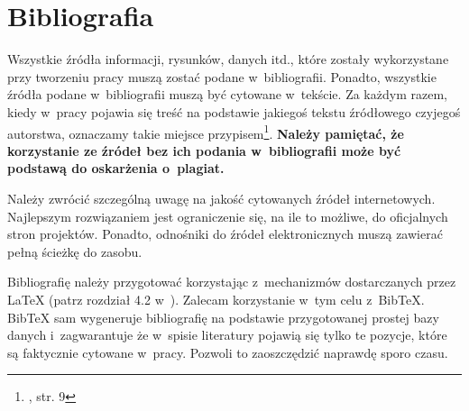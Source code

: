 \section{Bibliografia}\label{sec:app:bibliografia}
Wszystkie źródła informacji, rysunków, danych itd., które zostały wykorzystane przy tworzeniu pracy muszą zostać podane w~bibliografii. Ponadto, wszystkie źródła podane w~bibliografii muszą być cytowane w~tekście. Za każdym razem, kiedy w~pracy pojawia się treść na podstawie jakiegoś tekstu źródłowego czyjegoś autorstwa, oznaczamy takie miejsce przypisem\footnote{\cite{Nie10}, str. 9}. \textbf{Należy pamiętać, że korzystanie ze źródeł bez ich podania w~bibliografii może być podstawą do oskarżenia o~plagiat.}

Należy zwrócić szczególną uwagę na jakość cytowanych źródeł internetowych. Najlepszym rozwiązaniem jest ograniczenie się, na ile to możliwe, do oficjalnych stron projektów. Ponadto, odnośniki do źródeł elektronicznych muszą zawierać pełną ścieżkę do zasobu.

Bibliografię należy przygotować korzystając z~mechanizmów dostarczanych przez LaTeX (patrz rozdział 4.2 w~\cite{Oet11}). Zalecam korzystanie w~tym celu z~BibTeX. BibTeX sam wygeneruje bibliografię na podstawie przygotowanej prostej bazy danych i~zagwarantuje że w~spisie literatury pojawią się tylko te pozycje, które są faktycznie cytowane w~pracy. Pozwoli to zaoszczędzić naprawdę sporo czasu.
